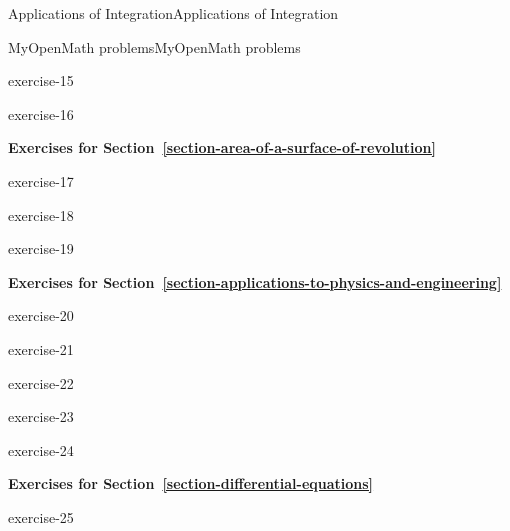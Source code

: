 \documentclass[10pt,]{book}
\numberwithin{equation}{section}
\begin{document}
\begin{chapterptx}{Applications of Integration}{}{Applications of Integration}{}{}
\begin{exercises-section}{MyOpenMath problems}{}{MyOpenMath problems}{}{}
\begin{exercisegroup}{1}
\begin{divisionexercise}{15}{}{}{exercise-15}
\end{divisionexercise}%
\begin{divisionexercise}{16}{}{}{exercise-16}%
\end{divisionexercise}%
\end{exercisegroup}
\par\medskip\noindent
\par\medskip\noindent%
\textbf{Exercises for Section~\ref*{section-area-of-a-surface-of-revolution}}\space\space\hypertarget{exercisegroup-5}{}%
\begin{exercisegroup}{1}
\begin{divisionexercise}{17}{}{}{exercise-17}%
\end{divisionexercise}%
\begin{divisionexercise}{18}{}{}{exercise-18}%
\end{divisionexercise}%
\begin{divisionexercise}{19}{}{}{exercise-19}%
\end{divisionexercise}%
\end{exercisegroup}
\par\medskip\noindent
\par\medskip\noindent%
\textbf{Exercises for Section~\ref*{section-applications-to-physics-and-engineering}}\space\space\hypertarget{exercisegroup-6}{}%
\begin{exercisegroup}{1}
\begin{divisionexercise}{20}{}{}{exercise-20}%
\end{divisionexercise}%
\begin{divisionexercise}{21}{}{}{exercise-21}%
\end{divisionexercise}%
\begin{divisionexercise}{22}{}{}{exercise-22}%
\end{divisionexercise}%
\begin{divisionexercise}{23}{}{}{exercise-23}%
\end{divisionexercise}%
\begin{divisionexercise}{24}{}{}{exercise-24}%
\end{divisionexercise}%
\end{exercisegroup}
\par\medskip\noindent
\par\medskip\noindent%
\textbf{Exercises for Section~\ref*{section-differential-equations}}\space\space\hypertarget{exercisegroup-7}{}%
\begin{exercisegroup}{1}
\begin{divisionexercise}{25}{}{}{exercise-25}%

\end{divisionexercise}
\end{exercisegroup}
\end{exercises-section}
\end{chapterptx}
\end{document}
